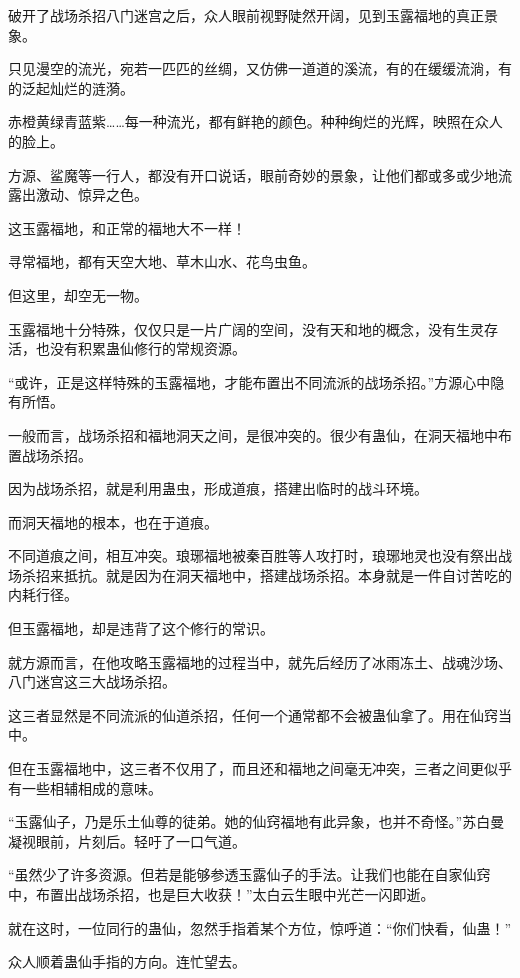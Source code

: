 
\begin{this_body}

破开了战场杀招八门迷宫之后，众人眼前视野陡然开阔，见到玉露福地的真正景象。

只见漫空的流光，宛若一匹匹的丝绸，又仿佛一道道的溪流，有的在缓缓流淌，有的泛起灿烂的涟漪。

赤橙黄绿青蓝紫……每一种流光，都有鲜艳的颜色。种种绚烂的光辉，映照在众人的脸上。

方源、鲨魔等一行人，都没有开口说话，眼前奇妙的景象，让他们都或多或少地流露出激动、惊异之色。

这玉露福地，和正常的福地大不一样！

寻常福地，都有天空大地、草木山水、花鸟虫鱼。

但这里，却空无一物。

玉露福地十分特殊，仅仅只是一片广阔的空间，没有天和地的概念，没有生灵存活，也没有积累蛊仙修行的常规资源。

“或许，正是这样特殊的玉露福地，才能布置出不同流派的战场杀招。”方源心中隐有所悟。

一般而言，战场杀招和福地洞天之间，是很冲突的。很少有蛊仙，在洞天福地中布置战场杀招。

因为战场杀招，就是利用蛊虫，形成道痕，搭建出临时的战斗环境。

而洞天福地的根本，也在于道痕。

不同道痕之间，相互冲突。琅琊福地被秦百胜等人攻打时，琅琊地灵也没有祭出战场杀招来抵抗。就是因为在洞天福地中，搭建战场杀招。本身就是一件自讨苦吃的内耗行径。

但玉露福地，却是违背了这个修行的常识。

就方源而言，在他攻略玉露福地的过程当中，就先后经历了冰雨冻土、战魂沙场、八门迷宫这三大战场杀招。

这三者显然是不同流派的仙道杀招，任何一个通常都不会被蛊仙拿了。用在仙窍当中。

但在玉露福地中，这三者不仅用了，而且还和福地之间毫无冲突，三者之间更似乎有一些相辅相成的意味。

“玉露仙子，乃是乐土仙尊的徒弟。她的仙窍福地有此异象，也并不奇怪。”苏白曼凝视眼前，片刻后。轻吁了一口气道。

“虽然少了许多资源。但若是能够参透玉露仙子的手法。让我们也能在自家仙窍中，布置出战场杀招，也是巨大收获！”太白云生眼中光芒一闪即逝。

就在这时，一位同行的蛊仙，忽然手指着某个方位，惊呼道：“你们快看，仙蛊！”

众人顺着蛊仙手指的方向。连忙望去。


\end{this_body}

